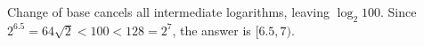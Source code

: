 Change of base cancels all intermediate logarithms, leaving $\log_2 100$. Since $2^{6.5}=64\sqrt2<100<128=2^7$, the answer is $\boxed{[6.5,7)}$.

